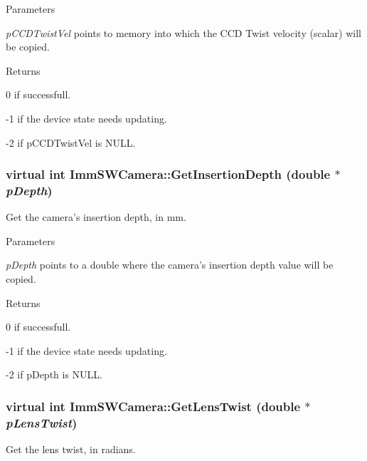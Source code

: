 \begin{DoxyParams}{Parameters}
\item[{\em pCCDTwistVel}]points to memory into which the CCD Twist velocity (scalar) will be copied.\end{DoxyParams}
\begin{DoxyReturn}{Returns}

\end{DoxyReturn}
0 if successfull.

-\/1 if the device state needs updating.

-\/2 if pCCDTwistVel is NULL. \hypertarget{classImmSWCamera_ad9c919c82f8b5776c348f779b352e9bf}{
\subsubsection[{GetInsertionDepth}]{\setlength{\rightskip}{0pt plus 5cm}virtual int ImmSWCamera::GetInsertionDepth (double $\ast$ {\em pDepth})}}
\label{classImmSWCamera_ad9c919c82f8b5776c348f779b352e9bf}
Get the camera's insertion depth, in mm.


\begin{DoxyParams}{Parameters}
\item[{\em pDepth}]points to a double where the camera's insertion depth value will be copied.\end{DoxyParams}
\begin{DoxyReturn}{Returns}

\end{DoxyReturn}
0 if successfull.

-\/1 if the device state needs updating.

-\/2 if pDepth is NULL. \hypertarget{classImmSWCamera_a656a7adbf572cabcda4d020515d1fe5b}{
\subsubsection[{GetLensTwist}]{\setlength{\rightskip}{0pt plus 5cm}virtual int ImmSWCamera::GetLensTwist (double $\ast$ {\em pLensTwist})}}
\label{classImmSWCamera_a656a7adbf572cabcda4d020515d1fe5b}
Get the lens twist, in radians.



